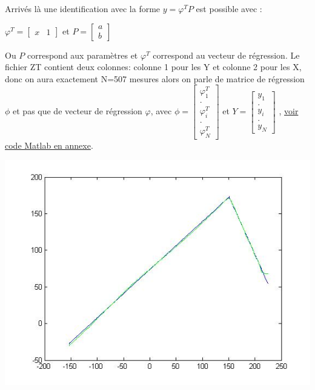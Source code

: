 	Arrivés là une identification avec la forme $ y = \varphi^{T}P $ est possible avec :
	  
	\begin{center}
		$ \varphi^{T} = \begin{bmatrix} x&1 \end{bmatrix} $ et $ P = \begin{bmatrix} a\\b \end{bmatrix}$
	\end{center}
	Ou $P$ correspond aux paramètres et $\varphi^{T}$ correspond au vecteur de régression. Le fichier ZT contient 			deux colonnes: colonne 1 pour les Y et colonne 2 	pour les X, donc on aura exactement N=507 mesures alors on 			parle de matrice de régression $\phi$ et pas que de vecteur de régression $\varphi$, avec $ \phi = 					\begin{bmatrix} \varphi^{T}_{1}\\.\\ \varphi^{T}_{i} \\.\\ \varphi^{T}_{N} \end{bmatrix} $ et $ Y = 					\begin{bmatrix} y_{1}\\.\\ y_{i} \\.\\ y_{N} \end{bmatrix} $ ,\label{section 1.2} \hyperref[Annexe A] {voir code 	Matlab en annexe}.
	
	\begin{center}
	\includegraphics[scale=0.7]{2.jpg}
	\label{fig3} 
	\end{center}

